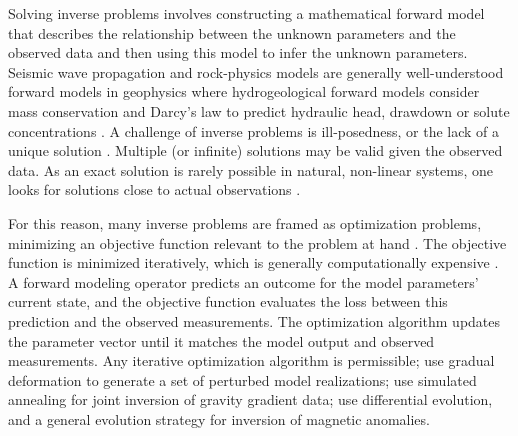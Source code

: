 Solving inverse problems involves constructing a mathematical forward model that describes the relationship between the unknown parameters and the observed data and then using this model to infer the unknown parameters. Seismic wave propagation and rock-physics models are generally well-understood forward models in geophysics \citep{grana2022probabilistic} where hydrogeological forward models consider mass conservation and Darcy's law to predict hydraulic head, drawdown or solute concentrations \citep{zhou2014inverse}. A challenge of inverse problems is ill-posedness, or the lack of a unique solution \citep{tarantola2005inverse}. Multiple (or infinite) solutions may be valid given the observed data. As an exact solution is rarely possible in natural, non-linear systems, one looks for solutions close to actual observations \citep{bardossy2016random}.

For this reason, many inverse problems are framed as optimization problems, minimizing an objective function relevant to the problem at hand \citep{giraud2019integration,nava-flores2023high,athens2022stochastic}. The objective function is minimized iteratively, which is generally computationally expensive \citep{zhou2014inverse}. A forward modeling operator predicts an outcome for the model parameters' current state, and the objective function evaluates the loss between this prediction and the observed measurements. The optimization algorithm updates the parameter vector until it matches the model output and observed measurements. Any iterative optimization algorithm is permissible; \cite{athens2022stochastic} use gradual deformation to generate a set of perturbed model realizations; \cite{nava-flores2023high} use simulated annealing for joint inversion of gravity gradient data; \cite{balkaya20173d} use differential evolution, and \cite{davilarodriguez2024threedimensional} a general evolution strategy for inversion of magnetic anomalies.





